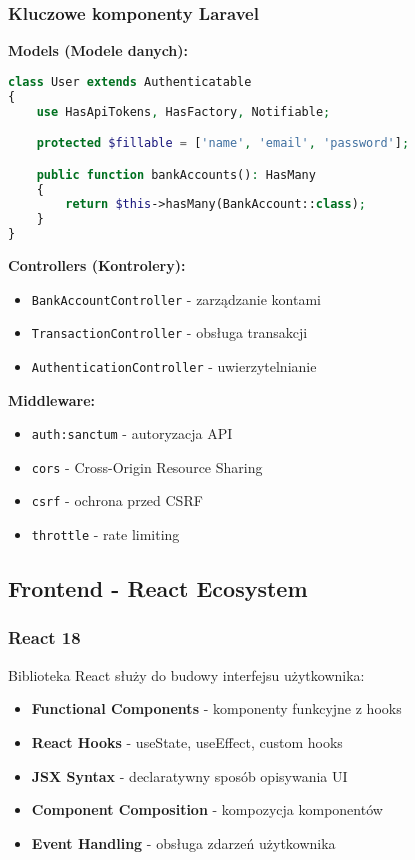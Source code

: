     \subsubsection{Kluczowe komponenty Laravel}

    \textbf{Models (Modele danych):}
    \begin{lstlisting}[language=PHP, caption=Przykład modelu User]
class User extends Authenticatable
{
    use HasApiTokens, HasFactory, Notifiable;

    protected $fillable = ['name', 'email', 'password'];

    public function bankAccounts(): HasMany
    {
        return $this->hasMany(BankAccount::class);
    }
}
    \end{lstlisting}

    \textbf{Controllers (Kontrolery):}
    \begin{itemize}
        \item \texttt{BankAccountController} - zarządzanie kontami
        \item \texttt{TransactionController} - obsługa transakcji
        \item \texttt{AuthenticationController} - uwierzytelnianie
    \end{itemize}

    \textbf{Middleware:}
    \begin{itemize}
        \item \texttt{auth:sanctum} - autoryzacja API
        \item \texttt{cors} - Cross-Origin Resource Sharing
        \item \texttt{csrf} - ochrona przed CSRF
        \item \texttt{throttle} - rate limiting
    \end{itemize}

    \subsection{Frontend - React Ecosystem}

    \subsubsection{React 18}
    Biblioteka React służy do budowy interfejsu użytkownika:

    \begin{itemize}
        \item \textbf{Functional Components} - komponenty funkcyjne z hooks
        \item \textbf{React Hooks} - useState, useEffect, custom hooks
        \item \textbf{JSX Syntax} - declaratywny sposób opisywania UI
        \item \textbf{Component Composition} - kompozycja komponentów
        \item \textbf{Event Handling} - obsługa zdarzeń użytkownika
    \end{itemize}

